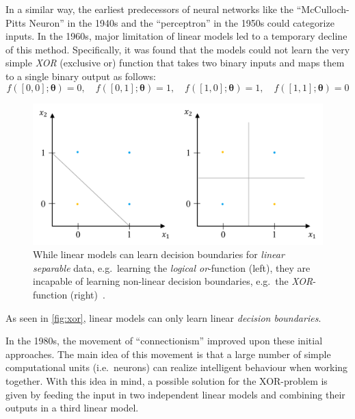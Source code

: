 In a similar way, the earliest predecessors of neural networks like the \enquote{McCulloch-Pitts Neuron} in the 1940s and the \enquote{perceptron} in the 1950s could categorize inputs.
In the 1960s, major limitation of linear models led to a temporary decline of this method.
Specifically, it was found that the models could not learn the very simple \textit{XOR} (exclusive or) function that takes two binary inputs and maps them to a single binary output as follows:
\[
    f([0,0]; \boldsymbol{\theta}) = 0, \quad
    f([0,1]; \boldsymbol{\theta}) = 1, \quad
    f([1,0]; \boldsymbol{\theta}) = 1, \quad
    f([1,1]; \boldsymbol{\theta}) = 0
\]
\begin{figure}
    \centering
    \includegraphics[width=.9\linewidth]{images/xor}
    \caption[Limits of the linear model.]{While linear models can learn decision boundaries for \textit{linear separable} data, e.g.\ learning the \textit{logical or}-function (left), they are incapable of learning non-linear decision boundaries, e.g.\ the \textit{XOR}-function (right)~\autocite{sonnet2022NeuralBoook}.}
    \label{fig:xor}
\end{figure}
As seen in \autoref{fig:xor}, linear models can only learn linear \textit{decision boundaries}.

In the 1980s, the movement of \enquote{connectionism} improved upon these initial approaches.
The main idea of this movement is that a large number of simple computational units (i.e.\ neurons) can realize intelligent behaviour when working together.
With this idea in mind, a possible solution for the XOR-problem is given by feeding the input in two independent linear models and combining their outputs in a third linear model.

